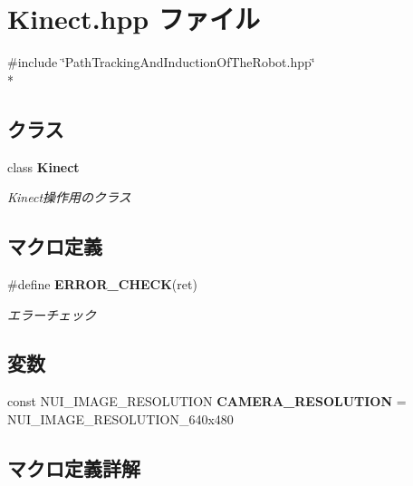 \section{Kinect.\-hpp ファイル}
\label{_kinect_8hpp}
{\ttfamily \#include \char`\"{}Path\-Tracking\-And\-Induction\-Of\-The\-Robot.\-hpp\char`\"{}}\\*
\subsection*{クラス}
\begin{DoxyCompactItemize}
\item 
class {\bf Kinect}
\begin{DoxyCompactList}\small\item\em Kinect操作用のクラス \end{DoxyCompactList}\end{DoxyCompactItemize}
\subsection*{マクロ定義}
\begin{DoxyCompactItemize}
\item 
\#define {\bf E\-R\-R\-O\-R\-\_\-\-C\-H\-E\-C\-K}(ret)
\begin{DoxyCompactList}\small\item\em エラーチェック \end{DoxyCompactList}\end{DoxyCompactItemize}
\subsection*{変数}
\begin{DoxyCompactItemize}
\item 
const N\-U\-I\-\_\-\-I\-M\-A\-G\-E\-\_\-\-R\-E\-S\-O\-L\-U\-T\-I\-O\-N {\bf C\-A\-M\-E\-R\-A\-\_\-\-R\-E\-S\-O\-L\-U\-T\-I\-O\-N} = N\-U\-I\-\_\-\-I\-M\-A\-G\-E\-\_\-\-R\-E\-S\-O\-L\-U\-T\-I\-O\-N\-\_\-640x480
\end{DoxyCompactItemize}


\subsection{マクロ定義詳解}
